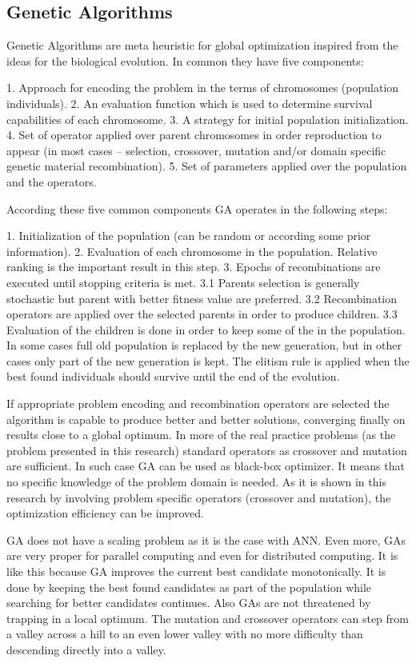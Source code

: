 \documentclass{llncs}
\begin{document}
\subsection{Genetic Algorithms}
%
Genetic Algorithms are meta heuristic for global optimization inspired from the ideas for the biological evolution. In common they have five components:

1. Approach for encoding the problem in the terms of chromosomes (population individuals).
2. An evaluation function which is used to determine survival capabilities of each chromosome.
3. A strategy for initial population initialization.
4. Set of operator applied over parent chromosomes in order reproduction to appear (in most cases – selection, crossover, mutation and/or domain specific genetic material recombination).
5. Set of parameters applied over the population and the operators.

According these five common components GA operates in the following steps:

1. Initialization of the population (can be random or according some prior information).
2. Evaluation of each chromosome in the population. Relative ranking is the important result in this step.
3. Epochs of recombinations are executed until stopping criteria is met.
  3.1 Parents selection is generally stochastic but parent with better fitness value are preferred.
  3.2 Recombination operators are applied over the selected parents in order to produce children.
  3.3 Evaluation of the children is done in order to keep some of the in the population. In some cases full old population is replaced by the new generation, but in other cases only part of the new generation is kept. The elitism rule is applied when the best found individuals should survive until the end of the evolution.

If appropriate problem encoding and recombination operators are selected the algorithm is capable to produce better and better solutions, converging finally on results close to a global optimum. In more of the real practice problems (as the problem presented in this research) standard operators as crossover and mutation are sufficient. In such case GA can be used as black-box optimizer. It means that no specific knowledge of the problem domain is needed. As it is shown in this research by involving problem specific operators (crossover and mutation), the optimization efficiency can be improved. 

GA does not have a scaling problem as it is the case with ANN. Even more, GAs are very proper for parallel computing and even for distributed computing. It is like this because GA improves the current best candidate monotonically. It is done by keeping the best found candidates as part of the population while searching for better candidates continues. Also GAs are not threatened by trapping in a local optimum. The mutation and crossover operators can step from a valley across a hill to an even lower valley with no more difficulty than descending directly into a valley.
%
\end{document}
